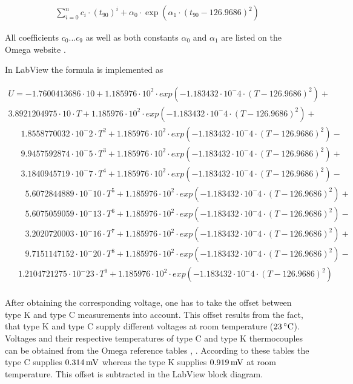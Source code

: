 \documentclass[parskip,12pt,headsepline,a4paper] {scrbook}
\begin{document}
\begin{align}  \label{direct-polynomial}
\sum\limits_{i=0}^n c_i \cdot (t_{90})^i + \alpha_0 \cdot \exp(\alpha_1 \cdot (t_{90} - 126.9686)^2)
\end{align}

All coefficients $c_0$...$c_9$ as well as both constants $\alpha_0$ and $\alpha_1$ are listed on the Omega website \cite{omega-polynomials}.

In LabView the formula is implemented as

\begin{multline}  \label{implemented-polynomial}
U = -1.7600413686 \cdot 10 + 1.185976 \cdot 10^2 \cdot exp(-1.183432 \cdot 10^-4 \cdot (T-126.9686)^2) + \\
    3.8921204975 \cdot 10 \cdot T + 1.185976 \cdot 10^2 \cdot exp(-1.183432 \cdot 10^-4 \cdot (T-126.9686)^2) + \\
    \quad \,\,\,1.8558770032 \cdot 10^-2 \cdot T^2 + 1.185976 \cdot 10^2 \cdot exp(-1.183432 \cdot 10^-4 \cdot (T-126.9686)^2) - \\
    \quad \,\,\,9.9457592874 \cdot 10^-5 \cdot T^3 + 1.185976 \cdot 10^2 \cdot exp(-1.183432 \cdot 10^-4 \cdot (T-126.9686)^2) + \\
    \quad \,\,\,3.1840945719 \cdot 10^-7 \cdot T^4 + 1.185976 \cdot 10^2 \cdot exp(-1.183432 \cdot 10^-4 \cdot (T-126.9686)^2) - \\
    \quad \quad5.6072844889 \cdot 10^-10 \cdot T^5 + 1.185976 \cdot 10^2 \cdot exp(-1.183432 \cdot 10^-4 \cdot (T-126.9686)^2) + \\
    \quad \quad5.6075059059 \cdot 10^-13 \cdot T^6 + 1.185976 \cdot 10^2 \cdot exp(-1.183432 \cdot 10^-4 \cdot (T-126.9686)^2) - \\
    \quad \quad3.2020720003 \cdot 10^-16 \cdot T^7 + 1.185976 \cdot 10^2 \cdot exp(-1.183432 \cdot 10^-4 \cdot (T-126.9686)^2) + \\
    \quad \quad9.7151147152 \cdot 10^-20 \cdot T^8 + 1.185976 \cdot 10^2 \cdot exp(-1.183432 \cdot 10^-4 \cdot (T-126.9686)^2) - \\
    \quad \,1.2104721275 \cdot 10^-23 \cdot T^9 + 1.185976 \cdot 10^2 \cdot exp(-1.183432 \cdot 10^-4 \cdot (T-126.9686)^2) \\
\end{multline}

After obtaining the corresponding voltage, one has to take the offset between type K and type C measurements into account. This offset results from the fact, that type K and type C supply different voltages at room temperature ($\unit[23]{^\circ C}$). Voltages and their respective temperatures of type C and type K thermocouples can be obtained from the Omega reference tables \cite{ref-typec}, \cite{ref-typek}. According to these tables the type C supplies $\unit[0.314]{mV}$ whereas the type K supplies $\unit[0.919]{mV}$ at room temperature. This offset is subtracted in the LabView block diagram.
\end{document}
